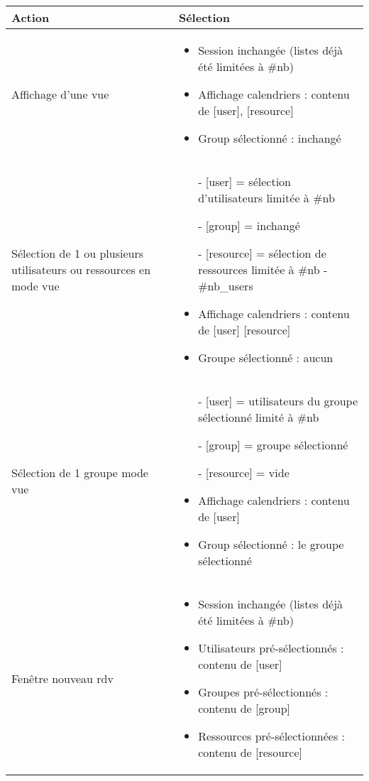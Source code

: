\begin{longtable}{|p{4cm}|p{10cm}|}
\hline
\textbf{Action} & \textbf{Sélection} \\

\hline
Affichage d'une vue
&
\begin{itemize}
\item Session inchangée (listes déjà été limitées à \#nb)
\item Affichage calendriers  : contenu de [user], [resource]
\item Group sélectionné : inchangé
\end{itemize}
\\ 

\hline
Sélection de 1 ou plusieurs utilisateurs ou ressources en mode vue
&
\begin{itemize}
\item[-] [user] = sélection d'utilisateurs limitée à \#nb
\item[-] [group] = inchangé
\item[-] [resource] = sélection de ressources limitée à \#nb - \#nb\_users
\item Affichage calendriers : contenu de [user] [resource]
\item Groupe sélectionné : aucun 
\end{itemize}
\\ 

\hline
Sélection de 1 groupe mode vue
&
\begin{itemize}
\item[-] [user] = utilisateurs du groupe sélectionné limité à \#nb
\item[-] [group] = groupe sélectionné
\item[-] [resource] = vide
\item Affichage calendriers : contenu de [user]
\item Group sélectionné : le groupe sélectionné
\end{itemize}
\\ 

\hline
Fenêtre nouveau rdv
&
\begin{itemize}
\item Session inchangée (listes déjà été limitées à \#nb)
\item Utilisateurs pré-sélectionnés : contenu de [user] 
\item Groupes pré-sélectionnés : contenu de [group] 
\item Ressources pré-sélectionnées : contenu de [resource]
\end{itemize}
\\ 


\end{longtable}
